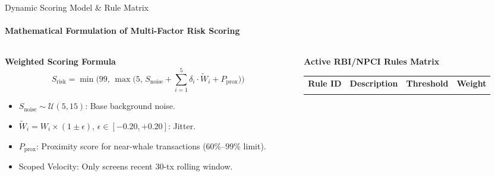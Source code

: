 \documentclass[aspectratio=169,10pt]{beamer}
\begin{document}
\begin{frame}{Dynamic Scoring Model \& Rule Matrix}
  \framesubtitle{Mathematical Formulation of Multi-Factor Risk Scoring}
  \begin{columns}[t]
    \begin{column}{0.50\textwidth}
      \begin{block}{\textbf{Weighted Scoring Formula}}
        \small
        \[
          S_{\text{risk}} = \min\Big(99, \, \max\Big(5, \, S_{\text{noise}} + \sum_{i=1}^5 \delta_i \cdot \widetilde{W}_i + P_{\text{prox}}\Big)\Big)
        \]
        \footnotesize
        \begin{itemize}
          \item $S_{\text{noise}} \sim \mathcal{U}(5, 15)$: Base background noise.
          \item $\widetilde{W}_i = W_i \times (1 \pm \epsilon)$, $\epsilon \in [-0.20, +0.20]$: Jitter.
          \item $P_{\text{prox}}$: Proximity score for near-whale transactions ($60\%\text{--}99\%$ limit).
          \item Scoped Velocity: Only screens recent 30-tx rolling window.
        \end{itemize}
      \end{block}
    \end{column}

    \begin{column}{0.48\textwidth}
      \begin{exampleblock}{\textbf{Active RBI/NPCI Rules Matrix}}
        \scriptsize
        \begin{tabular}{llcc}
          \toprule
          \textbf{Rule ID} & \textbf{Description} & \textbf{Threshold} & \textbf{Weight} \\
          \par\vspace{0.2em}\dotfill\par


\end{tabular}
\end{exampleblock}
\end{column}
\end{columns}
\end{frame}
\end{document}
